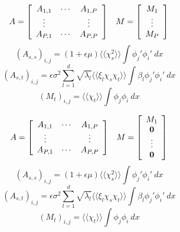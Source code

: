 \documentclass{beamer}
\begin{document}
\begin{frame}
    \[
        \begin{array}{l r}
        A = \left[\begin{array}{c c c}
            A_{1,1} & \cdots & A_{1,P} \\
            \vdots & & \vdots \\
            A_{P,1} & \cdots & A_{P,P}
        \end{array}\right]&
        M = \left[\begin{array}{c}
            M_1 \\ \vdots \\ M_P
        \end{array}\right]
    \end{array}
    \]
    \pause
    \[
        (A_{s,s})_{i,j} = (1 + \epsilon\mu)\langle\langle\chi_s^2\rangle\rangle
        \int\phi_j'\phi_i'\ dx
    \]
    \pause
    \[
        (A_{s,t})_{i,j} = \epsilon\sigma^2\sum_{l=1}^d\sqrt{\lambda_l}
            \langle\langle\xi_l\chi_s\chi_t\rangle\rangle
            \int\beta_l\phi_j'\phi_i'\ dx
    \]
    \pause
    \[
        (M_t)_{i,j} = \langle\langle\chi_t\rangle\rangle\int\phi_j\phi_i\ dx
    \]
\end{frame}

\begin{frame}
    \[
        \begin{array}{l r}
        A = \left[\begin{array}{c c c}
            A_{1,1} & \cdots & A_{1,P} \\
            \vdots & & \vdots \\
            A_{P,1} & \cdots & A_{P,P}
        \end{array}\right]&
        M = \left[\begin{array}{c}
                M_1 \\ \mathbf{0} \\ \vdots \\ \mathbf{0}
        \end{array}\right]
    \end{array}
    \]
    \[
        (A_{s,s})_{i,j} = (1 + \epsilon\mu)\langle\langle\chi_s^2\rangle\rangle
        \int\phi_j'\phi_i'\ dx
    \]
    \[
        (A_{s,t})_{i,j} = \epsilon\sigma^2\sum_{l=1}^d\sqrt{\lambda_l}
            \langle\langle\xi_l\chi_s\chi_t\rangle\rangle
            \int\beta_l\phi_j'\phi_i'\ dx
    \]
    \[
        (M_t)_{i,j} = \langle\langle\chi_t\rangle\rangle\int\phi_j\phi_i\ dx
    \]
\end{frame}
\end{document}
